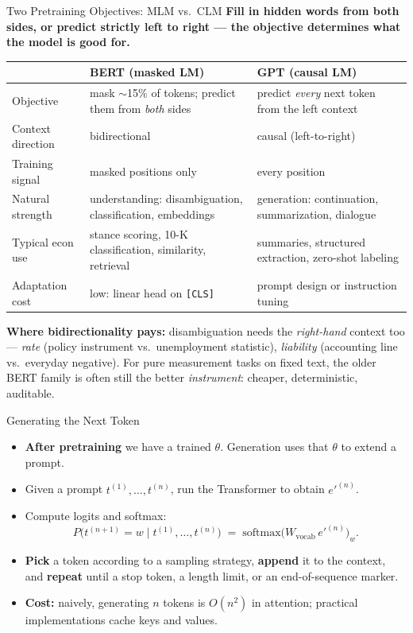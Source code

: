 \begin{frame}{Two Pretraining Objectives: MLM vs.\ CLM}
\textbf{Fill in hidden words from both sides, or predict strictly left to right --- the objective determines what the model is good for.}
\begin{center}
\renewcommand{\arraystretch}{1.3}
\footnotesize
\begin{tabular}{p{2.8cm} p{4.7cm} p{4.7cm}}
\toprule
 & \textbf{BERT (masked LM)} & \textbf{GPT (causal LM)} \\
\midrule
Objective & mask $\sim$15\% of tokens; predict them from \emph{both} sides & predict \emph{every} next token from the left context \\
Context direction & bidirectional & causal (left-to-right) \\
Training signal & masked positions only & every position \\
Natural strength & understanding: disambiguation, classification, embeddings & generation: continuation, summarization, dialogue \\
Typical econ use & stance scoring, 10-K classification, similarity, retrieval & summaries, structured extraction, zero-shot labeling \\
Adaptation cost & low: linear head on \texttt{[CLS]} & prompt design or instruction tuning \\
\bottomrule
\end{tabular}
\end{center}
\smallskip
\textbf{Where bidirectionality pays:} disambiguation needs the \emph{right-hand} context too --- \emph{rate} (policy instrument vs.\ unemployment statistic), \emph{liability} (accounting line vs.\ everyday negative). For pure measurement tasks on fixed text, the older BERT family is often still the better \emph{instrument}: cheaper, deterministic, auditable.
\end{frame}

\begin{frame}{Generating the Next Token}
\begin{itemize}
\item \textbf{After pretraining} we have a trained $\theta$. Generation uses that $\theta$ to extend a prompt.

\medskip
\item Given a prompt $t^{(1)}, \ldots, t^{(n)}$, run the Transformer to obtain $e'^{(n)}$.

\medskip
\item Compute logits and softmax:
\[
   P\bigl(t^{(n+1)} = w \mid t^{(1)}, \ldots, t^{(n)}\bigr) \;=\; \mathrm{softmax}\bigl(W_{\text{vocab}}\, e'^{(n)}\bigr)_{w}.
\]

\medskip
\item \textbf{Pick} a token according to a sampling strategy, \textbf{append} it to the context, and \textbf{repeat} until a stop token, a length limit, or an end-of-sequence marker.

\medskip
\item \textbf{Cost:} naively, generating $n$ tokens is $O(n^{2})$ in attention; practical implementations cache keys and values.
\end{itemize}
\end{frame}

